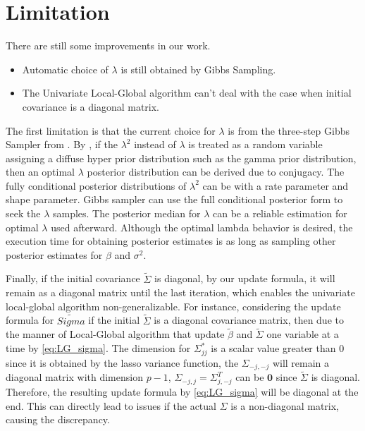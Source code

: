 %
%


\label{Chapter5}
\section{Limitation}
There are still some improvements in our work.


\begin{itemize}
	\item Automatic choice of $\lambda$ is still obtained by Gibbs Sampling.
	\item The Univariate Local-Global algorithm can't deal with the case when initial covariance is a diagonal matrix. 
\end{itemize}
The first limitation is that the current choice for $\lambda$ is from the three-step Gibbs Sampler from \cite{park_casella_2008}. By \cite{park_casella_2008}, if the $\lambda^2$ instead of $\lambda$ is treated as a random variable assigning a diffuse hyper prior distribution such as the gamma prior distribution, then an optimal $\lambda$ posterior distribution can be derived due to conjugacy. The fully conditional posterior distributions of $\lambda^2$ can be with a rate parameter and shape parameter. Gibbs sampler can use the full conditional posterior form to seek the $\lambda$ samples. The posterior median for $\lambda$ can be a reliable estimation for optimal $\lambda$ used afterward. Although the optimal lambda behavior is desired, the execution time for obtaining posterior estimates is as long as sampling other posterior estimates for $\beta$ and $\sigma^2$.

Finally, if the initial covariance $\tilde{\Sigma}$ is diagonal, by our update formula, it will remain as a diagonal matrix until the last iteration, which enables the univariate local-global algorithm non-generalizable.
For instance, considering the update formula for $\tilde{Sigma}$ if the initial $\tilde{\Sigma}$ is a diagonal covariance matrix, then 
due to the manner of Local-Global algorithm that update $\tilde{\beta}$ and $\tilde{\Sigma}$ one variable at a time by \autoref{eq:LG_sigma}. The dimension for $\Sigma_{jj}^{*}$ is a scalar value greater than 0 since it is obtained by the lasso variance function, the $\Sigma_{-j,-j}$ will remain a diagonal matrix with dimension $p-1$, $\Sigma_{-j,j} = \Sigma_{j,-j}^T$ can be $\mathbf{0}$ since $\tilde{\Sigma}$ is diagonal. Therefore, the resulting update formula by \autoref{eq:LG_sigma} will be diagonal at the end. This can directly lead to issues if the actual $\Sigma$ is a non-diagonal matrix, causing the discrepancy.

